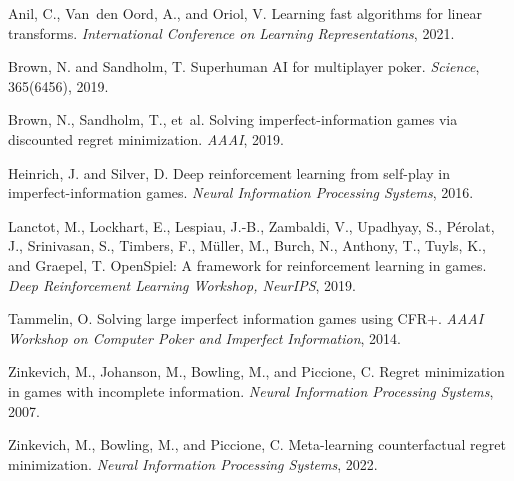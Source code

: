 \documentclass{icml2024}
\begin{document}

\begin{thebibliography}{}

Anil, C., Van~den Oord, A., and Oriol, V. Learning fast algorithms for linear transforms. \emph{International Conference on Learning Representations}, 2021.

Brown, N. and Sandholm, T. Superhuman AI for multiplayer poker. \emph{Science}, 365(6456), 2019.

Brown, N., Sandholm, T., et~al. Solving imperfect-information games via discounted regret minimization. \emph{AAAI}, 2019.

Heinrich, J. and Silver, D. Deep reinforcement learning from self-play in imperfect-information games. \emph{Neural Information Processing Systems}, 2016.

Lanctot, M., Lockhart, E., Lespiau, J.-B., Zambaldi, V., Upadhyay, S., Pérolat, J., Srinivasan, S., Timbers, F., Müller, M., Burch, N., Anthony, T., Tuyls, K., and Graepel, T. OpenSpiel: A framework for reinforcement learning in games. \emph{Deep Reinforcement Learning Workshop, NeurIPS}, 2019.

Tammelin, O. Solving large imperfect information games using CFR+. \emph{AAAI Workshop on Computer Poker and Imperfect Information}, 2014.

Zinkevich, M., Johanson, M., Bowling, M., and Piccione, C. Regret minimization in games with incomplete information. \emph{Neural Information Processing Systems}, 2007.

Zinkevich, M., Bowling, M., and Piccione, C. Meta-learning counterfactual regret minimization. \emph{Neural Information Processing Systems}, 2022.

\end{thebibliography}
\end{document}
